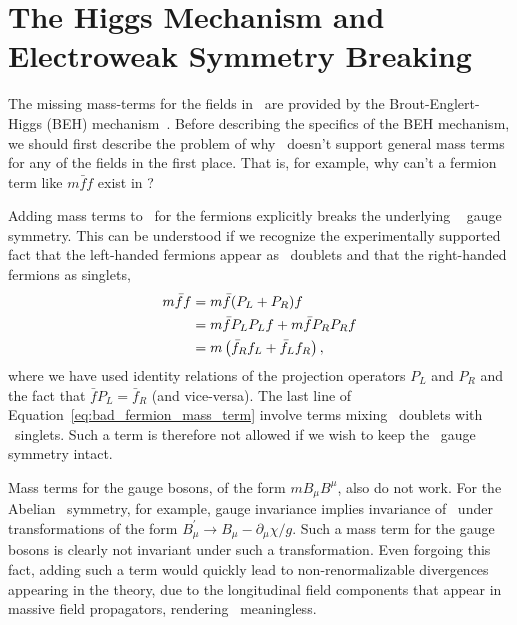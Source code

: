 \section{The Higgs Mechanism and Electroweak Symmetry Breaking}
\label{sec:higgs_description}

The missing mass-terms for the fields in \SML~are provided by the
Brout-Englert-Higgs (BEH) mechanism~\cite{Englert:1964et,Higgs:1964ia,Higgs:1964pj}.
Before describing the specifics of the BEH mechanism, we should first describe the problem
of why \SML~doesn't support general mass terms for any of the fields in the first place.
That is, for example, why can't a fermion term like $m \bar{f} f$ exist in \SML?

Adding mass terms to \SML~for the fermions explicitly breaks the underlying \SUtwo~
gauge symmetry. This can be understood if we recognize the experimentally supported
fact that the left-handed fermions appear as \SUtwo~doublets and that the
right-handed fermions as singlets,
\begin{align}
	m\bar{f}f &= m \bar{f}(P_L + P_R)f \notag \\
				   &= m \bar{f} P_L P_L f + m \bar{f} P_R P_R f  	\label{eq:bad_fermion_mass_term}\\
				   &= m \left( \bar{f}_R f_L + \bar{f}_L f_R \right), \notag
\end{align}
where we have used identity relations of the projection operators $P_L$ and $P_R$ and the fact that $\bar{f}P_L = \bar{f}_R$ (and vice-versa). The last line of Equation~\ref{eq:bad_fermion_mass_term} involve terms
mixing \SUtwo~doublets with \SUtwo~singlets. Such a term is therefore not allowed if we wish to keep the \SUtwo~gauge symmetry intact.

Mass terms for the gauge bosons, of the form $m B_{\mu} B^{\mu}$, also do not work. For the Abelian \Uone~symmetry, for example, gauge invariance implies invariance of \SML~under transformations
of the form $B_{\mu}^{\prime} \rightarrow B_{\mu} - \partial_{\mu}\chi /g$. Such a mass term for
the gauge bosons is clearly not invariant under such a transformation. Even forgoing this fact,
adding such a term would quickly lead to non-renormalizable divergences appearing in the theory,
due to the longitudinal field components that appear in massive field propagators, rendering \SML~meaningless.

